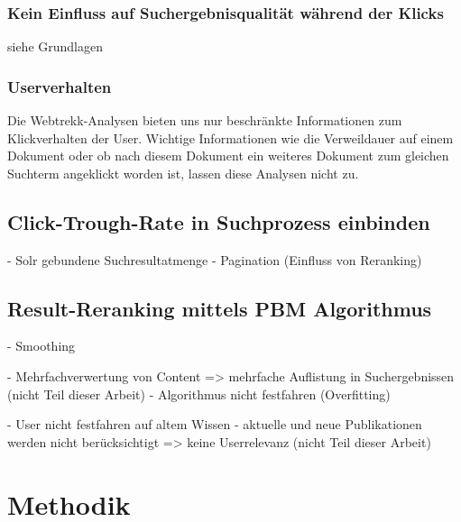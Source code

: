 \subsubsection{Kein Einfluss auf Suchergebnisqualität während der Klicks}
\label{sec:Reranking:Prozessaufbau:Click-Trough-Daten:Click-Trough-Suchergebnisqualität}

siehe Grundlagen

\subsubsection{Userverhalten}
\label{sec:Reranking:Prozessaufbau:Click-Trough-Daten:Click-Trough-Userverhalten}

Die Webtrekk-Analysen bieten uns nur beschränkte Informationen zum Klickverhalten der User. Wichtige Informationen wie die Verweildauer auf einem Dokument oder ob nach diesem Dokument ein weiteres Dokument zum gleichen Suchterm angeklickt worden ist, lassen diese Analysen nicht zu. 

\subsection{Click-Trough-Rate in Suchprozess einbinden}
\label{sec:Reranking:Prozessaufbau:SucheEinbinden}

- Solr gebundene Suchresultatmenge
- Pagination (Einfluss von Reranking)

\subsection{Result-Reranking mittels PBM Algorithmus}
\label{sec:Reranking:Prozessaufbau:Result-RerankingPBM}

- Smoothing

- Mehrfachverwertung von Content 
	=> mehrfache Auflistung in Suchergebnissen (nicht Teil dieser Arbeit)
- Algorithmus nicht festfahren (Overfitting)

- User nicht festfahren auf altem Wissen 
	- aktuelle und neue Publikationen werden nicht berücksichtigt 
		=> keine Userrelevanz (nicht Teil dieser Arbeit)
		

\section{Methodik}
\label{sec:Reranking:Methodik}

